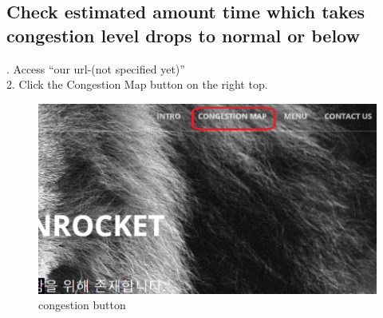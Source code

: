 \documentclass[journal]{IEEEtran}
\begin{document}
\subsection{Check estimated amount time which takes congestion
level drops to normal or below}
. Access “our url-(not specified yet)”\\   2. Click the Congestion Map button on the right top.
\newline
\begin{figure}[h]
\centering
\includegraphics[scale=0.5]{congestion.png}
\caption{congestion button}
\label{fig:Main page}
\end{figure}

\newline
\end{document}
